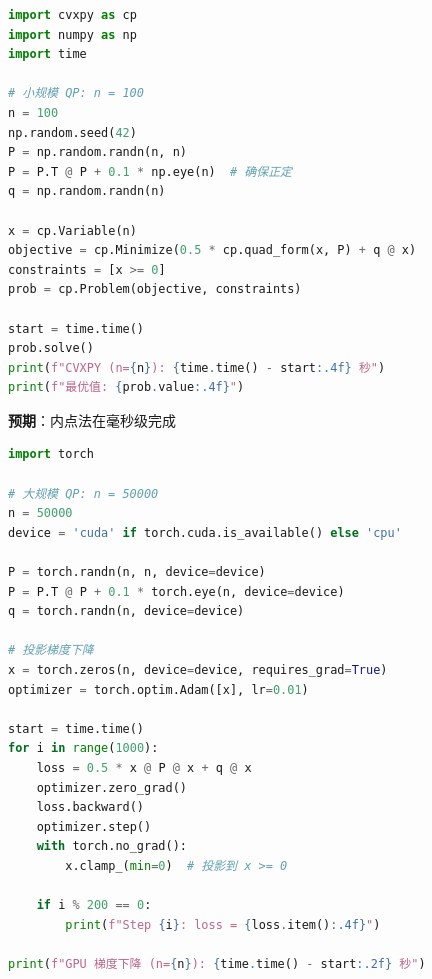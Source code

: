 \documentclass[12pt, a4paper]{ctexart}
\begin{document}
\begin{blackboard}

\begin{lstlisting}[language=Python]
import cvxpy as cp
import numpy as np
import time

# 小规模 QP: n = 100
n = 100
np.random.seed(42)
P = np.random.randn(n, n)
P = P.T @ P + 0.1 * np.eye(n)  # 确保正定
q = np.random.randn(n)

x = cp.Variable(n)
objective = cp.Minimize(0.5 * cp.quad_form(x, P) + q @ x)
constraints = [x >= 0]
prob = cp.Problem(objective, constraints)

start = time.time()
prob.solve()
print(f"CVXPY (n={n}): {time.time() - start:.4f} 秒")
print(f"最优值: {prob.value:.4f}")
\end{lstlisting}

\textbf{预期}：内点法在毫秒级完成

\end{blackboard}

\begin{blackboard}

\begin{lstlisting}[language=Python]
import torch

# 大规模 QP: n = 50000
n = 50000
device = 'cuda' if torch.cuda.is_available() else 'cpu'

P = torch.randn(n, n, device=device)
P = P.T @ P + 0.1 * torch.eye(n, device=device)
q = torch.randn(n, device=device)

# 投影梯度下降
x = torch.zeros(n, device=device, requires_grad=True)
optimizer = torch.optim.Adam([x], lr=0.01)

start = time.time()
for i in range(1000):
    loss = 0.5 * x @ P @ x + q @ x
    optimizer.zero_grad()
    loss.backward()
    optimizer.step()
    with torch.no_grad():
        x.clamp_(min=0)  # 投影到 x >= 0
    
    if i % 200 == 0:
        print(f"Step {i}: loss = {loss.item():.4f}")

print(f"GPU 梯度下降 (n={n}): {time.time() - start:.2f} 秒")
\end{lstlisting}

\end{blackboard}
\end{document}
